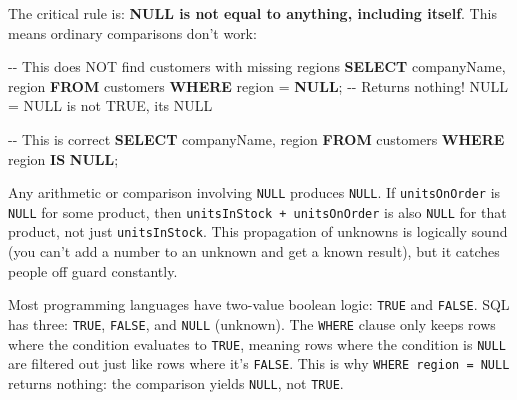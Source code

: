 \documentclass[
  letterpaper,
  DIV=11,
  numbers=noendperiod]{scrreprt}
\newenvironment{Shaded}{\begin{snugshade}}{\end{snugshade}}
\newcommand{\CommentTok}[1]{\textcolor[rgb]{0.37,0.37,0.37}{#1}}
\newcommand{\KeywordTok}[1]{\textcolor[rgb]{0.00,0.23,0.31}{\textbf{#1}}}
\newcommand{\NormalTok}[1]{\textcolor[rgb]{0.00,0.23,0.31}{#1}}
\newcommand{\OperatorTok}[1]{\textcolor[rgb]{0.37,0.37,0.37}{#1}}
\begin{document}
The critical rule is: \textbf{NULL is not equal to anything, including
itself}. This means ordinary comparisons don't work:

\begin{codelisting}

\caption{\texttt{duckdb}}

\begin{Shaded}
\begin{Highlighting}[]
\CommentTok{{-}{-} This does NOT find customers with missing regions}
\KeywordTok{SELECT}\NormalTok{ companyName, region}
\KeywordTok{FROM}\NormalTok{ customers}
\KeywordTok{WHERE}\NormalTok{ region }\OperatorTok{=} \KeywordTok{NULL}\NormalTok{;  }\CommentTok{{-}{-} Returns nothing! NULL = NULL is not TRUE, it\textquotesingle{}s NULL}

\CommentTok{{-}{-} This is correct}
\KeywordTok{SELECT}\NormalTok{ companyName, region}
\KeywordTok{FROM}\NormalTok{ customers}
\KeywordTok{WHERE}\NormalTok{ region }\KeywordTok{IS} \KeywordTok{NULL}\NormalTok{;}
\end{Highlighting}
\end{Shaded}

\end{codelisting}

Any arithmetic or comparison involving \texttt{NULL} produces
\texttt{NULL}. If \texttt{unitsOnOrder} is \texttt{NULL} for some
product, then \texttt{unitsInStock\ +\ unitsOnOrder} is also
\texttt{NULL} for that product, not just \texttt{unitsInStock}. This
propagation of unknowns is logically sound (you can't add a number to an
unknown and get a known result), but it catches people off guard
constantly.

\begin{tcolorbox}[enhanced jigsaw, opacitybacktitle=0.6, arc=.35mm, colback=white, bottomtitle=1mm, opacityback=0, toprule=.15mm, left=2mm, colbacktitle=quarto-callout-important-color!10!white, breakable, coltitle=black, toptitle=1mm, colframe=quarto-callout-important-color-frame, bottomrule=.15mm, titlerule=0mm, title=\textcolor{quarto-callout-important-color}{\faExclamation}\hspace{0.5em}{The Three-Value Logic of SQL}, rightrule=.15mm, leftrule=.75mm]

Most programming languages have two-value boolean logic: \texttt{TRUE}
and \texttt{FALSE}. SQL has three: \texttt{TRUE}, \texttt{FALSE}, and
\texttt{NULL} (unknown). The \texttt{WHERE} clause only keeps rows where
the condition evaluates to \texttt{TRUE}, meaning rows where the
condition is \texttt{NULL} are filtered out just like rows where it's
\texttt{FALSE}. This is why \texttt{WHERE\ region\ =\ NULL} returns
nothing: the comparison yields \texttt{NULL}, not \texttt{TRUE}.

\end{tcolorbox}
\end{document}
